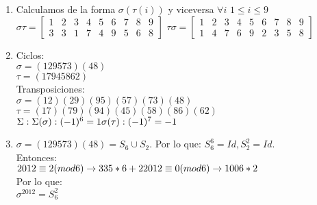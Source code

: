 \begin{solution}
\begin{enumerate}
\item Calculamos de la forma $\sigma(\tau(i))$ y viceversa $\forall i$ $1\leq i \leq 9$ \\
$\sigma\tau = \begin{bmatrix} 1 & 2 & 3 & 4 & 5 & 6 & 7 & 8 & 9 \\
                                3 & 3 & 1 & 7 & 4 & 9 & 5 & 6 & 8
                          \end{bmatrix}$                
$ \tau\sigma = \begin{bmatrix} 1 & 2 & 3 & 4 & 5 & 6 & 7 & 8 & 9 \\
                                1 & 4 & 7 & 6 & 9 & 2 & 3 & 5 & 8
                         \end{bmatrix}$ \\

\item Ciclos:\\
      $\sigma = ( 1 2 9 5 7 3 )( 4 8 )$ \\
      $\tau = ( 1 7 9 4 5 8 6 2 )$ \\
      Transposiciones: \\
      $\sigma = ( 1 2 )( 2 9 )( 9 5 ) ( 5 7 )( 7 3 )( 4 8 )$ \\
      $\tau = ( 1 7 )( 7 9 )( 9 4 )( 4 5 )( 5 8 )( 8 6 )( 6 2 )$\\
      $\Sigma : \\
      \Sigma(\sigma):(-1)^6 = 1 \\
      \sigma(\tau): (-1)^7= -1 $\\
\item $\sigma = ( 1 2 9 5 7 3 )( 4 8 ) = S_6 \cup S_2$. Por lo que: $S_6^6=Id , S_2^2= Id$.\\
Entonces: \\
$2012 \equiv 2 (mod 6) \to 335*6+2 \\
 2012 \equiv 0 (mod 6) \to 1006*2 $\\
 Por lo que:\\
 $\sigma^{2012} = S_6^2$
\end{enumerate}

\end{solution}
